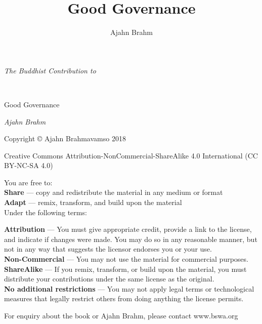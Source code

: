 \documentclass[11pt, openany]{book}
\title{Good Governance}
\author{Ajahn Brahm}
\date{}
\begin{document}
\frontmatter
\pagestyle{empty}
\newpage
\begin{center}\end{center}
\vspace{6em}
\begin{center}\begin{LARGE}\emph{The Buddhist Contribution to}\end{LARGE}\\
\vspace{1em}
\begin{Huge}\begin{sc}Good Governance\end{sc}\end{Huge}
\vspace{22em}

\begin{huge}\emph{Ajahn Brahm}\end{huge}


\end{center}



\newpage







\begin{small}{\sffamily

\noindent Copyright © Ajahn Brahmavamso 2018

\medskip

\noindent Creative Commons Attribution-NonCommercial-ShareAlike 4.0 International (CC BY-NC-SA 4.0)

\medskip

\noindent You are free to:\\
\textbf{Share} — copy and redistribute the material in any medium or format\\
\textbf{Adapt} — remix, transform, and build upon the material\\

\noindent Under the following terms:

\noindent \textbf{Attribution} — You must give appropriate credit, provide a link to the license, and indicate if changes were made. You may do so in any reasonable manner, but not in any way that suggests the licensor endorses you or your use.\\
\textbf{Non-Commercial} — You may not use the material for commercial purposes.\\
\textbf{ShareAlike} — If you remix, transform, or build upon the material, you must distribute your contributions under the same license as the original.\\
\textbf{No additional restrictions} — You may not apply legal terms or technological measures that legally restrict others from doing anything the license permits.


\vspace{4em}

\noindent For enquiry about the book or Ajahn Brahm, please contact www.bswa.org

}


\end{small}
\mainmatter
\pagestyle{fancy}
\end{document}
